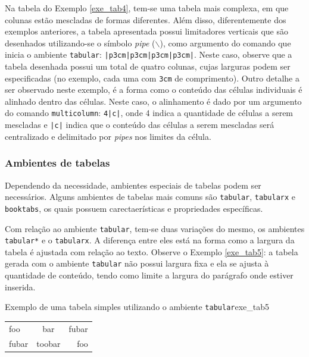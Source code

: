 Na tabela do Exemplo \ref{exe_tab4}, tem-se uma tabela mais complexa, em que colunas estão mescladas de formas diferentes. Além disso, diferentemente dos exemplos anteriores, a tabela apresentada possui limitadores verticais que são desenhados utilizando-se o símbolo \textit{pipe} ($\backslash$), como argumento do comando que inicia o ambiente \texttt{tabular}: {\tt |p{3cm}|p{3cm}|p{3cm}|p{3cm}|}. Neste caso, observe que a tabela desenhada possui um total de quatro colunas, cujas larguras podem ser especificadas (no exemplo, cada uma com {\tt 3cm} de comprimento). Outro detalhe a ser observado neste exemplo, é a forma como o conteúdo das células individuais é alinhado dentro das células. Neste caso, o alinhamento é dado por um argumento do comando \texttt{multicolumn}: \texttt{{4}{|c|}}, onde 4 indica a quantidade de células a serem mescladas e \texttt{|c|} indica que o conteúdo das células a serem mescladas será centralizado e delimitado por \textit{pipes} nos limites da célula.

\subsubsection*{Ambientes de tabelas}
\label{sec:amb_tabs}

Dependendo da necessidade, ambientes especiais de tabelas podem ser necessários. Alguns ambientes de tabelas mais comuns são {\tt tabular}, {\tt tabularx} e {\tt booktabs}, os quais possuem carectaerísticas e propriedades específicas.


Com relação ao ambiente {\tt tabular}, tem-se duas variações do mesmo, os ambientes {\tt tabular*} e o {\tt tabularx}. A diferença entre eles está na forma como a largura da tabela é ajustada com relação ao texto. Observe o Exemplo \ref{exe_tab5}: a tabela gerada com o ambiente {\tt tabular} não possui largura fixa e ela se ajusta à quantidade de conteúdo, tendo como limite a largura do parágrafo onde estiver inserida.

\begin{texexptitled}[breakable,center lower,enhanced,middle=2mm]{Exemplo de uma tabela simples utilizando o ambiente {\tt tabular}}{exe_tab5}
\begin{tabular}{|l|c|r|}
  \hline
  foo   & bar    & fubar \\
  fubar & toobar & foo \\
  \hline
\end{tabular}
\end{texexptitled}

